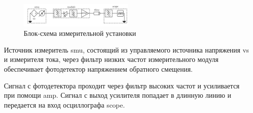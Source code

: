 \begin{figure}[h]
    \centering
    \includegraphics[width=0.5\textwidth]{figures/exp.png}
    \caption{Блок-схема измерительной установки}
    \label{fig:exp}
\end{figure}

Источник измеритель smu, состоящий из управляемого источника напряжения vs и измерителя тока, через фильтр низких частот измерительного модуля обеспечивает фотодетектор напряжением обратного смещения. 

Сигнал с фотодетектора проходит через фильтр высоких частот и усиливается при помощи amp. Сигнал с выход усилителя попадает в длинную линию и передается на вход осциллографа scope. 


\newpage
